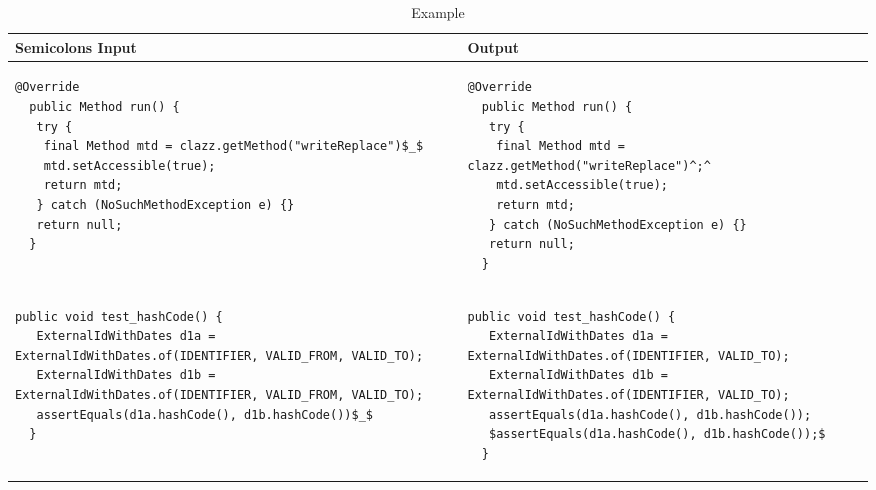 \begin{landscape}
\begin{table}[p]
\begin{tabular}{ | m{10cm} | m{10cm} | }
  \hline
  Semicolons Input & Output \\
  \hline
  {\begin{lstlisting}[style=table]
  @Override
  public Method run() {
   try {
    final Method mtd = clazz.getMethod("writeReplace")$_$
    mtd.setAccessible(true);
    return mtd;
   } catch (NoSuchMethodException e) {}
   return null;
  }
  \end{lstlisting}} &
  {\begin{lstlisting}[style=table]
  @Override
  public Method run() {
   try {
    final Method mtd = clazz.getMethod("writeReplace")^;^
    mtd.setAccessible(true);
    return mtd;
   } catch (NoSuchMethodException e) {}
   return null;
  }
  \end{lstlisting}} \\
  \hline
  {\begin{lstlisting}[style=table]
  public void test_hashCode() {
   ExternalIdWithDates d1a = ExternalIdWithDates.of(IDENTIFIER, VALID_FROM, VALID_TO);
   ExternalIdWithDates d1b = ExternalIdWithDates.of(IDENTIFIER, VALID_FROM, VALID_TO);
   assertEquals(d1a.hashCode(), d1b.hashCode())$_$
  }
  \end{lstlisting}} &
  {\begin{lstlisting}[style=table]
  public void test_hashCode() {
   ExternalIdWithDates d1a = ExternalIdWithDates.of(IDENTIFIER, VALID_TO);
   ExternalIdWithDates d1b = ExternalIdWithDates.of(IDENTIFIER, VALID_TO);
   assertEquals(d1a.hashCode(), d1b.hashCode());
   $assertEquals(d1a.hashCode(), d1b.hashCode());$
  }
  \end{lstlisting}} \\
  \hline
\end{tabular}
\caption{Example}
\label{semicolon_showcase_table}
\end{table}


\end{landscape}
